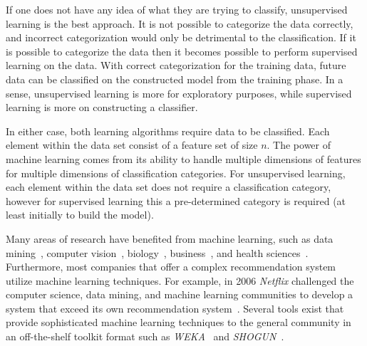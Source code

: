If one does not have any idea of what they are trying to classify, unsupervised learning is the best approach. It is not possible to categorize the data correctly, and incorrect categorization would only be detrimental to the classification. If it is possible to categorize the data then it becomes possible to perform supervised learning on the data. With correct categorization for the training data, future data can be classified on the constructed model from the training phase. In a sense, unsupervised learning is more for exploratory purposes, while supervised learning is more on constructing a classifier.

In either case, both learning algorithms require data to be classified. Each element within the data set consist of a feature set of size $n$. The power of machine learning comes from its ability to handle multiple dimensions of features for multiple dimensions of classification categories. For unsupervised learning, each element within the data set does not require a classification category, however for supervised learning this a pre-determined category is required (at least initially to build the model).

Many areas of research have benefited from machine learning, such as data mining~\cite{WFH11}, computer vision~\cite{Her03}, biology~\cite{OLP08}, business~\cite{Her00}, and health sciences~\cite{Kon01}. Furthermore, most companies that offer a complex recommendation system utilize machine learning techniques. For example, in 2006 \emph{Netflix} challenged the computer science, data mining, and machine learning communities to develop a system that exceed its own recommendation system~\cite{BL07}. Several tools exist that provide sophisticated machine learning techniques to the general community in an off-the-shelf toolkit format such as \emph{WEKA}~\cite{HFH+09} and \emph{SHOGUN}~\cite{SRH+10}.


